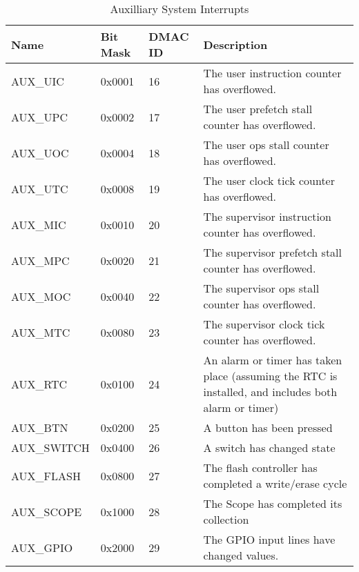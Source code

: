 \documentclass{gqtekspec}
\begin{document}
\begin{table}[htbp]
\begin{center}\begin{tabular}{|p{0.9in}|p{0.75in}|p{0.75in}|p{3.00in}|}\hline
\rowcolor[gray]{0.85} Name & Bit Mask & DMAC ID &Description \\\hline\hline
AUX\_UIC & 0x0001 & 16 & The user instruction counter has overflowed.\\\hline
AUX\_UPC & 0x0002 & 17 & The user prefetch stall counter has overflowed.\\\hline
AUX\_UOC & 0x0004 & 18 & The user ops stall counter has overflowed.\\\hline
AUX\_UTC & 0x0008 & 19 & The user clock tick counter has overflowed.\\\hline
AUX\_MIC & 0x0010 & 20 & The supervisor instruction counter has overflowed.\\\hline
AUX\_MPC & 0x0020 & 21 & The supervisor prefetch stall counter has overflowed.\\\hline
AUX\_MOC & 0x0040 & 22 & The supervisor ops stall counter has overflowed.\\\hline
AUX\_MTC & 0x0080 & 23 & The supervisor clock tick counter has overflowed.\\\hline
AUX\_RTC    & 0x0100 & 24& An alarm or timer has taken place (assuming the RTC
		is installed, and includes both alarm or timer)\\\hline
AUX\_BTN    & 0x0200 & 25 & A button has been pressed\\\hline
AUX\_SWITCH & 0x0400 & 26 & A switch has changed state\\\hline
AUX\_FLASH  & 0x0800 & 27 & The flash controller has completed a write/erase cycle\\\hline
AUX\_SCOPE  & 0x1000 & 28 & The Scope has completed its collection\\\hline
AUX\_GPIO   & 0x2000 & 29 & The GPIO input lines have changed values.\\\hline
\end{tabular}
\caption{Auxilliary System Interrupts}\label{tbl:aux-ints}
\end{center}\end{table}
\end{document}
